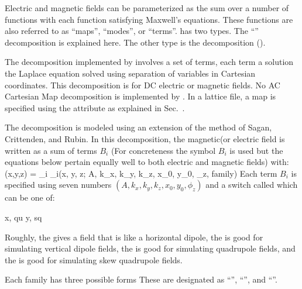 Electric and magnetic fields can be parameterized as the sum over a number of functions
with each function satisfying Maxwell's equations. These functions are also referred to as
``maps'', ``modes'', or ``terms''. \bmad has two types. The ``''
decomposition is explained here. The other type is the  decomposition
().

The  decomposition implemented by \bmad involves a set of terms, each
term a solution the Laplace equation solved using separation of variables in Cartesian
coordinates. This decomposition is for DC electric or magnetic fields. No AC Cartesian Map
decomposition is implemented by \bmad. In a lattice file, a  map is specified using
the  attribute as explained in Sec.~.

The  decomposition is modeled using an extension of the method of Sagan,
Crittenden, and Rubin\cite{b:wiggler}. In this decomposition, the magnetic(or electric
field is written as a sum of terms $B_i$ (For concreteness the symbol $B_i$ is used but
the equations below pertain equally well to both electric and magnetic fields) with:
\Begineq
  \bfB(x,y,z) = \sum_i \bfB_i(x, y, z; A, k_x, k_y, k_z, x_0, y_0, \phi_z, family)
\Endeq
Each term $B_i$ is specified using seven numbers $(A, k_x, k_y, k_z,
x_0, y_0, \phi_z)$ and a switch called  which can be one of:
\begin{example}
  x,  qu
  y,  sq
\end{example}
Roughly, the   gives a field that is like a horizontal dipole, the 
 is good for simulating vertical dipole fields, the   is good
for simulating quadrupole fields, and the   is good for simulating skew
quadrupole fields.

Each family has three possible forms These are designated as ``'',
``'', and ``''. 

